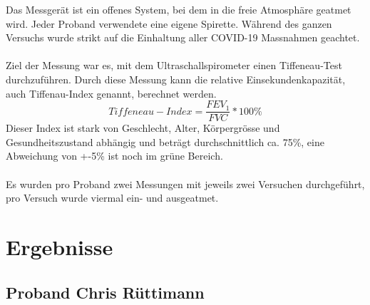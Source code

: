 \documentclass[11pt]{scrartcl}
\begin{document}
    Das Messgerät ist ein offenes System, bei dem in die freie Atmosphäre geatmet wird.
    Jeder Proband verwendete eine eigene Spirette.
    Während des ganzen Versuchs wurde strikt auf die Einhaltung aller COVID-19 Massnahmen geachtet.\\\\
    Ziel der Messung war es, mit dem Ultraschallspirometer einen Tiffeneau-Test durchzuführen.
    Durch diese Messung kann die relative Einsekundenkapazität, auch Tiffenau-Index genannt, berechnet werden.
    \begin{equation}
        Tiffeneau-Index = \frac{FEV_{1}}{FVC} * 100\%
    \end{equation}
    Dieser Index ist stark von Geschlecht, Alter, Körpergrösse und Gesundheitszustand abhängig und beträgt
    durchschnittlich ca.
    75\%, eine Abweichung von +-5\% ist noch im grüne Bereich.\\\\
    Es wurden pro Proband zwei Messungen mit jeweils zwei Versuchen durchgeführt, pro Versuch wurde viermal ein- und
    ausgeatmet.

    \section{Ergebnisse}
    \subsection{Proband Chris Rüttimann}
\end{document}
